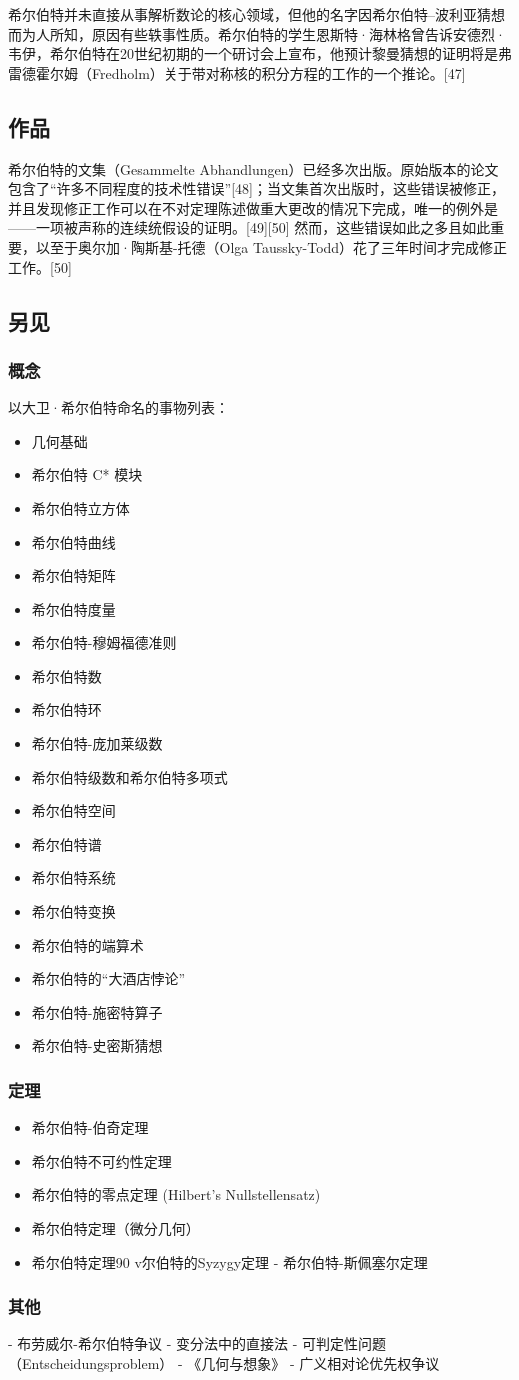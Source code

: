 希尔伯特并未直接从事解析数论的核心领域，但他的名字因希尔伯特–波利亚猜想而为人所知，原因有些轶事性质。希尔伯特的学生恩斯特·海林格曾告诉安德烈·韦伊，希尔伯特在20世纪初期的一个研讨会上宣布，他预计黎曼猜想的证明将是弗雷德霍尔姆（Fredholm）关于带对称核的积分方程的工作的一个推论。[47]
\subsection{作品}
希尔伯特的文集（Gesammelte Abhandlungen）已经多次出版。原始版本的论文包含了“许多不同程度的技术性错误”[48]；当文集首次出版时，这些错误被修正，并且发现修正工作可以在不对定理陈述做重大更改的情况下完成，唯一的例外是——一项被声称的连续统假设的证明。[49][50] 然而，这些错误如此之多且如此重要，以至于奥尔加·陶斯基-托德（Olga Taussky-Todd）花了三年时间才完成修正工作。[50]
\subsection{另见}
\subsubsection{概念}
以大卫·希尔伯特命名的事物列表：
\begin{itemize}
\item 几何基础
\item 希尔伯特 C* 模块
\item 希尔伯特立方体
\item 希尔伯特曲线
\item 希尔伯特矩阵
\item 希尔伯特度量
\item 希尔伯特-穆姆福德准则
\item 希尔伯特数
\item 希尔伯特环
\item 希尔伯特-庞加莱级数
\item 希尔伯特级数和希尔伯特多项式
\item 希尔伯特空间
\item 希尔伯特谱
\item 希尔伯特系统
\item 希尔伯特变换
\item 希尔伯特的端算术
\item 希尔伯特的“大酒店悖论”
\item 希尔伯特-施密特算子
\item 希尔伯特-史密斯猜想
\end{itemize}
\subsubsection{定理}
\begin{itemize}
\item 希尔伯特-伯奇定理
\item 希尔伯特不可约性定理
\item 希尔伯特的零点定理 (Hilbert's Nullstellensatz)
\item 希尔伯特定理（微分几何）
\item 希尔伯特定理90
v尔伯特的Syzygy定理
- 希尔伯特-斯佩塞尔定理
\end{itemize}

\subsubsection{其他}

- 布劳威尔-希尔伯特争议
- 变分法中的直接法
- 可判定性问题（Entscheidungsproblem）
- 《几何与想象》
- 广义相对论优先权争议